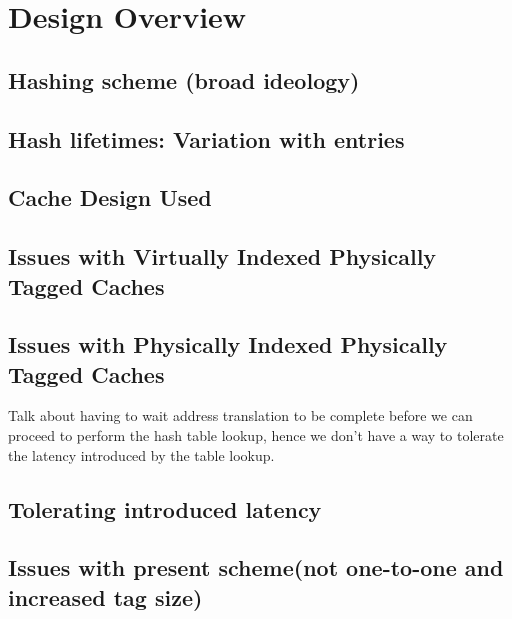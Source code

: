 \section{Design Overview}
\subsection{Hashing scheme (broad ideology)}
\subsection{Hash lifetimes: Variation with entries}
\subsection{Cache Design Used}
\subsection{Issues with Virtually Indexed Physically Tagged Caches}
\subsection{Issues with Physically Indexed Physically Tagged Caches}
Talk about having to wait address translation to be complete before we can 
proceed to perform the hash table lookup, hence we don't have a way to tolerate the latency
introduced by the table lookup. 
\subsection{Tolerating introduced latency}
\subsection{Issues with present scheme(not one-to-one and increased tag size)}

